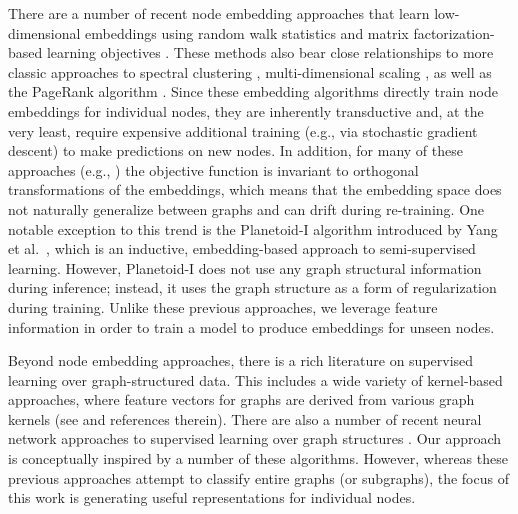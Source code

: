 There are a number of recent node embedding approaches that learn low-dimensional embeddings using random walk statistics and matrix factorization-based learning objectives \cite{cao2015grarep,grover2016node2vec,perozzi2014deepwalk,tang2015line,wang2016structural}.
These methods also bear close relationships to more classic approaches to spectral clustering \cite{ng2001spectral}, multi-dimensional scaling \cite{kruskal1964multidimensional}, as well as the PageRank algorithm \cite{page1999pagerank}. 
Since these embedding algorithms directly train node embeddings for individual nodes, they are inherently transductive and, at the very least, require expensive additional training (e.g., via stochastic gradient descent) to make predictions on new nodes.
In addition, for many of these approaches (e.g., \cite{grover2016node2vec,perozzi2014deepwalk,tang2015line,wang2016structural}) the objective function is invariant to orthogonal transformations of the embeddings, which means that the embedding space does not naturally generalize between graphs and can drift during re-training.
One notable exception to this trend is the Planetoid-I algorithm introduced by Yang et al.\ \cite{yang2016revisiting}, which is an inductive, embedding-based approach to semi-supervised learning.
However, Planetoid-I does not use any graph structural information during inference; instead, it uses the graph structure as a form of regularization during training.
Unlike these previous approaches, we leverage feature information in order to train a model to produce embeddings for unseen nodes. 

Beyond node embedding approaches, there is a rich literature on supervised learning over graph-structured data. 
This includes a wide variety of kernel-based approaches, where feature vectors for graphs are derived from various graph kernels (see \cite{shervashidze2011weisfeiler} and references therein). 
There are also a number of recent neural network approaches to supervised learning over graph structures \cite{dai2016discriminative,gori2005new,li2015gated,scarselli2009graph}.
Our approach is conceptually inspired by a number of these algorithms.
However, whereas these previous approaches attempt to classify entire graphs (or subgraphs), the focus of this work is generating useful representations for individual nodes. 

